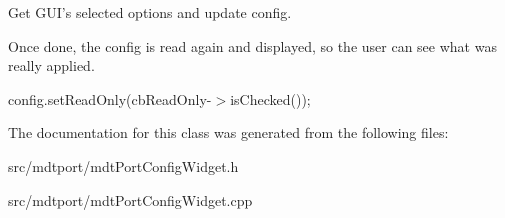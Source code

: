 Get GUI's selected options and update config. 

Once done, the config is read again and displayed, so the user can see what was really applied. 

config.setReadOnly(cbReadOnly-\/$>$isChecked()); 



The documentation for this class was generated from the following files:\begin{DoxyCompactItemize}
\item 
src/mdtport/mdtPortConfigWidget.h\item 
src/mdtport/mdtPortConfigWidget.cpp\end{DoxyCompactItemize}
